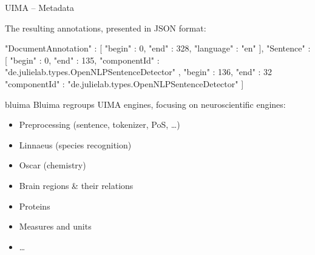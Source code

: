 \documentclass[10pt, compress, xcolor={usenames,dvipsnames}]{beamer}
\newcommand{\SmallArrow}{\ding{228}}
\newcommand{\BigArrow}{$\Longrightarrow$} %
\renewcommand{\emph}[1]{\alert{#1}}
\begin{document}
%
%
%
%


\begin{frame}[fragile]{UIMA -- Metadata}

  The resulting annotations, presented in JSON format:

  \vspace{1em}

  \begin{lstjson}
"DocumentAnnotation" : [
  { "begin" : 0,    "end" : 328,  "language" : "en" }
],
"Sentence" : [
  { "begin" : 0,    "end" : 135,
    "componentId" :
        "de.julielab.types.OpenNLPSentenceDetector" },
  { "begin" : 136,  "end" : 32
    "componentId" :
        "de.julielab.types.OpenNLPSentenceDetector" }
]
  \end{lstjson}

\end{frame}

\begin{frame}[fragile]{bluima}
  \emph{Bluima} regroups UIMA engines, focusing on neuroscientific engines:

  \begin{itemize}[label=\SmallArrow]

    \item Preprocessing (sentence, tokenizer, PoS, \ldots)

    \item Linnaeus (species recognition)

    \item Oscar (chemistry)

    \item \emph{Brain regions \& their relations}

    \item Proteins

    \item Measures and units

    \item \ldots

  \end{itemize}

\end{frame}
\end{document}
